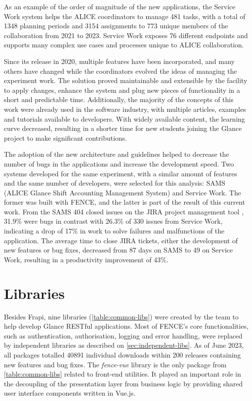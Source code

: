 As an example of the order of magnitude of the new applications, the Service Work system helps the ALICE coordinators to manage 481 tasks, with a total of 1348 planning periods and 3154 assignments to 773 unique members of the collaboration from 2021 to 2023. Service Work exposes 76 different endpoints and supports many complex use cases and processes unique to ALICE collaboration.

Since its release in 2020, multiple features have been incorporated, and many others have changed while the coordinators evolved the ideas of managing the experiment work. The solution proved maintainable and extensible by the facility to apply changes, enhance the system and plug new pieces of functionality in a short and predictable time. Additionally, the majority of the concepts of this work were already used in the software industry, with multiple articles, examples and tutorials available to developers. With widely available content, the learning curve decreased, resulting in a shorter time for new students joining the Glance project to make significant contributions.

The adoption of the new architecture and guidelines helped to decrease the number of bugs in the applications and increase the development speed. Two systems developed for the same experiment, with a similar amount of features and the same number of developers, were selected for this analysis: SAMS (ALICE Glance Shift Accounting Management System) \cite{heron-tcc} and Service Work. The former was built with FENCE, and the latter is part of the result of this current work. From the SAMS 404 closed issues on the JIRA project management tool \cite{jira}, 31.9\% were bugs in contrast with 26.3\% of 330 issues from Service Work, indicating a drop of 17\% in work to solve failures and malfunctions of the application. The average time to close JIRA tickets, either the development of new features or bug fixes, decreased from 87 days on SAMS to 49 on Service Work, resulting in a productivity improvement of 43\%.

\section{Libraries}

Besides Frapi, nine libraries (\autoref{table:common-libs}) were created by the team to help develop Glance RESTful applications. Most of FENCE's core functionalities, such as authentication, authorisation, logging and error handling, were replaced by independent libraries as described on \autoref{sec:independent-libs}. As of June 2023, all packages totalled 40891 individual downloads within 200 releases containing new features and bug fixes. The \textit{fence-vue} \cite{fence-vue} \cite{de-jesus-tcc} library is the only package from \autoref{table:common-libs} related to front-end utilities. It played an important role in the decoupling of the presentation layer from business logic by providing shared user interface components written in Vue.js.

